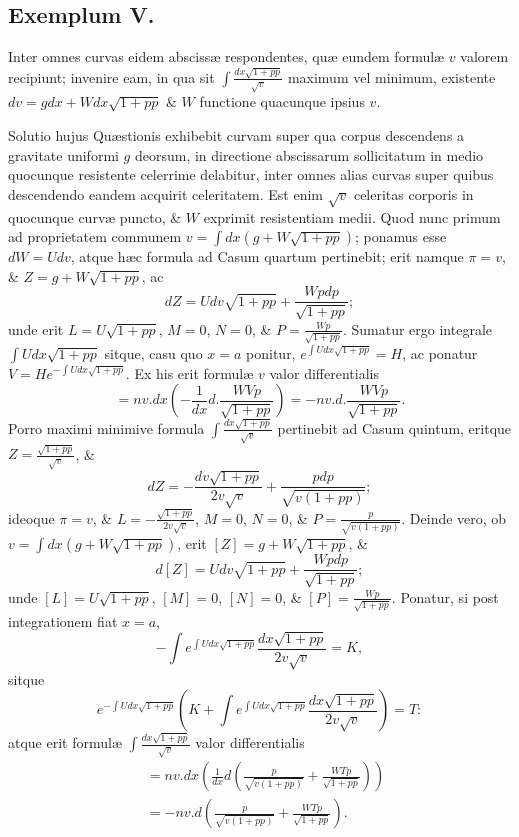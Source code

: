 \subsection*{Exemplum V.}
Inter omnes curvas eidem abscissæ respondentes, quæ eundem formulæ $v$ valorem recipiunt; invenire eam, in qua sit $\int\frac{dx\sqrt{1+pp}}{\sqrt v}$ maximum vel minimum, existente $dv=gdx+Wdx\sqrt{1+pp}$ \& $W$ functione quacunque ipsius $v$.

Solutio hujus Quæstionis exhibebit curvam super qua corpus
descendens a gravitate uniformi $g$ deorsum, in directione abscissarum sollicitatum in medio quocunque resistente celerrime delabitur, inter omnes alias curvas super quibus descendendo eandem acquirit celeritatem. Est enim $\sqrt v$ celeritas corporis in quocunque curvæ puncto, \& $W$ exprimit resistentiam medii. Quod nunc primum ad proprietatem communem $v=\int dx(g+W\sqrt{1+pp})$; ponamus esse $dW=Udv$, atque hæc formula ad Casum quartum pertinebit; erit namque $\pi=v$, \& $Z=g+W\sqrt{1+pp}$, ac
\[dZ=Udv\sqrt{1+pp}+\frac{Wpdp}{\sqrt{1+pp}};\]
unde erit $L=U\sqrt{1+pp}$, $M=0$, $N=0$, \& $P=\frac{Wp}{\sqrt{1+pp}}$. Sumatur ergo integrale $\int Udx\sqrt{1+pp}$ sitque, casu quo $x=a$ ponitur, $e^{\int Udx\sqrt{1+pp}}=H$, ac ponatur $V=He^{-\int Udx\sqrt{1+pp}}$. Ex his erit formulæ $v$ valor differentialis
\[=nv.dx\left(-\frac1{dx}d.\frac{WVp}{\sqrt{1+pp}}\right)=-nv.d.\frac{WVp}{\sqrt{1+pp}}.\]
Porro maximi minimive formula $\int\frac{dx\sqrt{1+pp}}{\sqrt v}$ pertinebit ad Casum quintum, eritque $Z=\frac{\sqrt{1+pp}}{\sqrt v}$, \&
\[dZ=-\frac{dv\sqrt{1+pp}}{2v\sqrt v}+\frac{pdp}{\sqrt{v(1+pp)}};\]
ideoque $\pi=v$, \& $L=-\frac{\sqrt{1+pp}}{2v\sqrt v}$, $M=0$, $N=0$, \& $P=\frac p{\sqrt{v(1+pp)}}$. Deinde vero, ob $v=\int dx(g+W\sqrt{1+pp})$, erit $[Z]=g+W\sqrt{1+pp}$, \&
\[d[Z]=Udv\sqrt{1+pp}+\frac{Wpdp}{\sqrt{1+pp}};\]
unde $[L]=U\sqrt{1+pp}$, $[M]=0$, $[N]=0$, \& $[P]=\frac{Wp}{\sqrt{1+pp}}$. Ponatur, si post integrationem fiat $x=a$,
\[-\int e^{\int Udx\sqrt{1+pp}}\frac{dx\sqrt{1+pp}}{2v\sqrt v}=K,\]
sitque
\[e^{-\int Udx\sqrt{1+pp}}\left(K+\int e^{\int Udx\sqrt{1+pp}}\frac{dx\sqrt{1+pp}}{2v\sqrt v}\right)=T:\]
atque erit formulæ $\int\frac{dx\sqrt{1+pp}}{\sqrt v}$ valor differentialis
\[
\begin{aligned}
&=nv.dx\left(\frac1{dx}d\left(\frac p{\sqrt{v(1+pp)}}+\frac{WTp}{\sqrt{1+pp}}\right)\right)\\
&=-nv.d\left(\frac p{\sqrt{v(1+pp)}}+\frac{WTp}{\sqrt{1+pp}}\right).
\end{aligned}
\]
